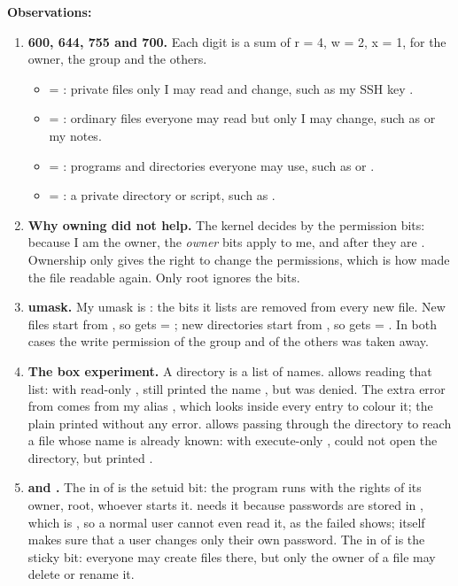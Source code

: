 \documentclass[11pt,a4paper]{article}
\begin{document}
\textbf{Observations:}
\begin{enumerate}
  \item \textbf{600, 644, 755 and 700.} Each digit is a sum of r = 4, w = 2, x = 1, for the
  owner, the group and the others.
  \begin{itemize}
    \item {} = : private files only I may read and change, such as my SSH
    key .
    \item {} = : ordinary files everyone may read but only I may change,
    such as  or my notes.
    \item {} = : programs and directories everyone may use, such as
     or .
    \item {} = : a private directory or script, such as
    .
  \end{itemize}
  \item \textbf{Why owning  did not help.} The kernel decides by the permission
  bits: because I am the owner, the \emph{owner} bits apply to me, and after 
  they are \code{---}. Ownership only gives the right to change the permissions, which is how
   made the file readable again. Only root ignores the bits.
  \item \textbf{umask.} My umask is : the bits it lists are removed from every new
  file. New files start from , so  gets  =
  ; new directories start from , so  gets  =
  . In both cases the write permission of the group and of the others was taken
  away.
  \item \textbf{The box experiment.} A directory is a list of names.  allows reading
  that list: with read-only ,  still printed the name , but
   was denied. The extra error from  comes from my alias
  , which looks inside every entry to colour it; the plain
   printed  without any error.  allows passing
  through the directory to reach a file whose name is already known: with execute-only
  ,  could not open the directory, but  printed .
  \item \textbf{ and .} The  in  of
   is the setuid bit: the program runs with the rights of its owner, root,
  whoever starts it.  needs it because passwords are stored in
  , which is , so a normal user cannot even read it, as
  the failed  shows;  itself makes sure that a user changes only their own
  password. The  in  of  is the sticky bit: everyone may
  create files there, but only the owner of a file may delete or rename it.
\end{enumerate}
\end{document}
